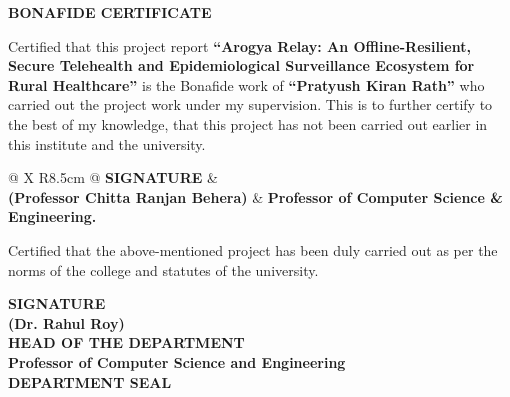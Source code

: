 \documentclass[12pt,a4paper,oneside]{report}
\begin{document}
\setcounter{page}{2}

\clearpage
{}
\thispagestyle{plain}

\begin{center}
    {\fontsize{16}{20}\selectfont \bfseries BONAFIDE CERTIFICATE}
\end{center}
\vspace{0.8cm}

{\fontsize{13}{20}\selectfont
\noindent Certified that this project report \textbf{``Arogya Relay: An Offline-Resilient, Secure Telehealth and Epidemiological Surveillance Ecosystem for Rural Healthcare''} is the Bonafide work of \textbf{``Pratyush Kiran Rath''} who carried out the project work under my supervision. This is to further certify to the best of my knowledge, that this project has not been carried out earlier in this institute and the university.
}

\vspace{1.8cm}

\noindent
\begin{tabularx}{\textwidth}{@{} X R{8.5cm} @{}}
    \textbf{SIGNATURE} & \\[1.0cm]
    \textbf{(Professor Chitta Ranjan Behera)} & \textbf{Professor of Computer Science \& Engineering.}
\end{tabularx}

\vspace{1.8cm}

{\fontsize{13}{20}\selectfont
\noindent Certified that the above-mentioned project has been duly carried out as per the norms of the college and statutes of the university.
}

\vspace{1.5cm}

\begin{center}
    \textbf{SIGNATURE} \\[1.0cm]
    \textbf{(Dr. Rahul Roy)} \\[0.15cm]
    \textbf{HEAD OF THE DEPARTMENT} \\[0.15cm]
    \textbf{Professor of Computer Science and Engineering} \\[1.0cm]
    \textbf{DEPARTMENT SEAL}
\end{center}
\end{document}
